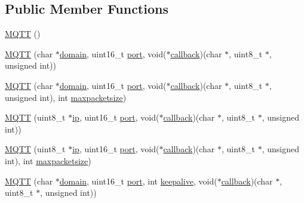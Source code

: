\subsection*{Public Member Functions}
\begin{DoxyCompactItemize}
\item 
\hyperlink{class_m_q_t_t_a75b5fb0489a6ecc75d75ed2362e60aef}{M\+Q\+TT} ()
\item 
\hyperlink{class_m_q_t_t_a2ef4121d54530e1ffc918f2b0e3cbdc4}{M\+Q\+TT} (char $\ast$\hyperlink{class_m_q_t_t_a36cef0e2c168c4ce68dda653df6e3be1}{domain}, uint16\+\_\+t \hyperlink{class_m_q_t_t_a27559174e21256b6235ff281ba605fe8}{port}, void($\ast$\hyperlink{class_m_q_t_t_ad40d1645b7ec6c7b969883825f0c0469}{callback})(char $\ast$, uint8\+\_\+t $\ast$, unsigned int))
\item 
\hyperlink{class_m_q_t_t_a95dc3446cd91fd3448c3fe3938a40f72}{M\+Q\+TT} (char $\ast$\hyperlink{class_m_q_t_t_a36cef0e2c168c4ce68dda653df6e3be1}{domain}, uint16\+\_\+t \hyperlink{class_m_q_t_t_a27559174e21256b6235ff281ba605fe8}{port}, void($\ast$\hyperlink{class_m_q_t_t_ad40d1645b7ec6c7b969883825f0c0469}{callback})(char $\ast$, uint8\+\_\+t $\ast$, unsigned int), int \hyperlink{class_m_q_t_t_aac8cf32807b542ce45a9060d9769f35e}{maxpacketsize})
\item 
\hyperlink{class_m_q_t_t_a0e4560eca8b493628aed67f949b45d42}{M\+Q\+TT} (uint8\+\_\+t $\ast$\hyperlink{class_m_q_t_t_a70618323bb75b467ed054dd191397b37}{ip}, uint16\+\_\+t \hyperlink{class_m_q_t_t_a27559174e21256b6235ff281ba605fe8}{port}, void($\ast$\hyperlink{class_m_q_t_t_ad40d1645b7ec6c7b969883825f0c0469}{callback})(char $\ast$, uint8\+\_\+t $\ast$, unsigned int))
\item 
\hyperlink{class_m_q_t_t_a39e00a946c41fbe9eb504577269569cc}{M\+Q\+TT} (uint8\+\_\+t $\ast$\hyperlink{class_m_q_t_t_a70618323bb75b467ed054dd191397b37}{ip}, uint16\+\_\+t \hyperlink{class_m_q_t_t_a27559174e21256b6235ff281ba605fe8}{port}, void($\ast$\hyperlink{class_m_q_t_t_ad40d1645b7ec6c7b969883825f0c0469}{callback})(char $\ast$, uint8\+\_\+t $\ast$, unsigned int), int \hyperlink{class_m_q_t_t_aac8cf32807b542ce45a9060d9769f35e}{maxpacketsize})
\item 
\hyperlink{class_m_q_t_t_a799fede50157a7573f43582ccd429b5e}{M\+Q\+TT} (char $\ast$\hyperlink{class_m_q_t_t_a36cef0e2c168c4ce68dda653df6e3be1}{domain}, uint16\+\_\+t \hyperlink{class_m_q_t_t_a27559174e21256b6235ff281ba605fe8}{port}, int \hyperlink{class_m_q_t_t_af93aeb459130c36b2a8d894011f10492}{keepalive}, void($\ast$\hyperlink{class_m_q_t_t_ad40d1645b7ec6c7b969883825f0c0469}{callback})(char $\ast$, uint8\+\_\+t $\ast$, unsigned int))

\end{DoxyCompactItemize}
